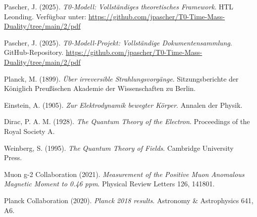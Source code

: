 \documentclass[12pt,a4paper]{report}
\begin{document}
	\begin{thebibliography}{99}
		Pascher, J. (2025). \textit{T0-Modell: Vollständiges theoretisches Framework}. HTL Leonding. Verfügbar unter: \url{https://github.com/jpascher/T0-Time-Mass-Duality/tree/main/2/pdf}
		
		Pascher, J. (2025). \textit{T0-Modell-Projekt: Vollständige Dokumentensammlung}. GitHub-Repository. \url{https://github.com/jpascher/T0-Time-Mass-Duality/tree/main/2/pdf}
		
		Planck, M. (1899). \textit{Über irreversible Strahlungsvorgänge}. Sitzungsberichte der Königlich Preußischen Akademie der Wissenschaften zu Berlin.
		
		Einstein, A. (1905). \textit{Zur Elektrodynamik bewegter Körper}. Annalen der Physik.
		
		Dirac, P. A. M. (1928). \textit{The Quantum Theory of the Electron}. Proceedings of the Royal Society A.
		
		Weinberg, S. (1995). \textit{The Quantum Theory of Fields}. Cambridge University Press.
		
		Muon g-2 Collaboration (2021). \textit{Measurement of the Positive Muon Anomalous Magnetic Moment to 0.46 ppm}. Physical Review Letters 126, 141801.
		
		Planck Collaboration (2020). \textit{Planck 2018 results}. Astronomy \& Astrophysics 641, A6.
	\end{thebibliography}
	
	
\end{document}
